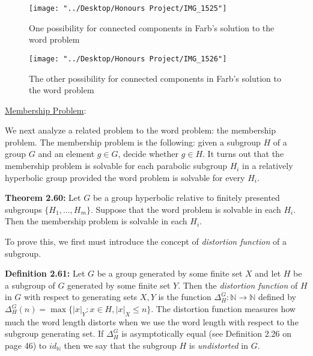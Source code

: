 \documentclass[12pt]{article}
\newcommand{\vs}{\vskip10pt}
\begin{document}
	
\begin{figure} [H]
	\centering
	\texttt{[image: "../Desktop/Honours Project/IMG\_1525"]}
	\caption{One possibility for connected components in Farb's solution to the word problem}
	\label{fig:img1525}
\end{figure}

\begin{figure} [H]
	\centering
	\texttt{[image: "../Desktop/Honours Project/IMG\_1526"]}
	\caption{The other possibility for connected components in Farb's solution to the word problem}
	\label{fig:img1526}
\end{figure}


	\vs 

	\underline{Membership Problem}: 
	
	\vs 
	
	We next analyze a related problem to the word problem: the membership problem. The membership problem is the following: given a subgroup $H$ of a group $G$ and an element $g \in G$, decide whether $g \in H$. It turns out that the membership problem is solvable for each parabolic subgroup $H_i$ in a relatively hyperbolic group provided the word problem is solvable for every $H_i$. 
	
	\vs
	
	\textbf{Theorem 2.60: } Let $G$ be a group hyperbolic relative to finitely presented subgroups $\{H_1,...,H_m\}$. Suppose that the word problem is solvable in each $H_i$. Then the membership problem is solvable in each $H_i$. 
	
	\vs 
	
	To prove this, we first must introduce the concept of \textit{distortion function} of a subgroup. 
	
	\vs
	
	\textbf{Definition 2.61: } Let $G$ be a group generated by some finite set $X$ and let $H$ be a subgroup of $G$ generated by some finite set $Y$. Then the \textit{distortion function} of $H$ in $G$ with respect to generating sets $X,Y$ is the function $\Delta_H^G : \mathbb{N} \rightarrow \mathbb{N} $ defined by $\Delta_H^G (n) = \max \{ \vert x \vert_Y : x \in H, \vert x \vert_X \leq n\}$. The distortion function measures how much the word length distorts when we use the word length with respect to the subgroup generating set. If $\Delta_H^G$ is asymptotically equal (see Definition 2.26 on page 46) to $id_{\mathbb{N}}$ then we say that the subgroup $H$ is \textit{undistorted} in $G$. 
	
\end{document}
